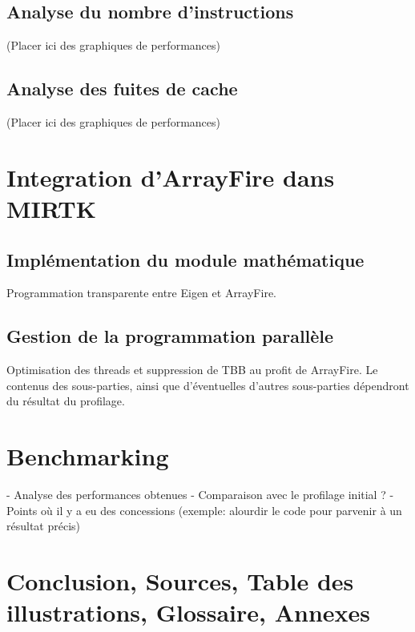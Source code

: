 \documentclass[12pt]{report}
\begin{document}
	\subsection{Analyse du nombre d'instructions}
	
	(Placer ici des graphiques de performances)
	\subsection{Analyse des fuites de cache}
	
	(Placer ici des graphiques de performances)
	
	\section{Integration d'ArrayFire dans MIRTK}
	\subsection{Implémentation du module mathématique}
	Programmation transparente entre Eigen et ArrayFire.
	\subsection{Gestion de la programmation parallèle}
	Optimisation des threads et suppression de TBB au profit de ArrayFire.
	\newline
	Le contenus des sous-parties, ainsi que d'éventuelles d'autres sous-parties dépendront du résultat du profilage.
	\section{Benchmarking}
	- Analyse des performances obtenues \newline
	- Comparaison avec le profilage initial ? \newline
	- Points où il y a eu des concessions (exemple: alourdir le code pour parvenir à un résultat précis)
\section*{Conclusion, Sources, Table des illustrations, Glossaire, Annexes} %
	
\end{document}
